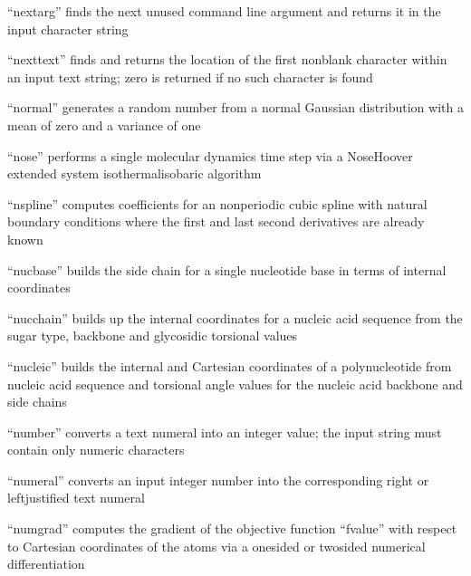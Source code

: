 \documentclass[letterpaper,11pt,english]{sphinxmanual}
\begin{document}
“nextarg” finds the next unused command line argument
and returns it in the input character string


“nexttext” finds and returns the location of the first
non\sphinxhyphen{}blank character within an input text string; zero
is returned if no such character is found


“normal” generates a random number from a normal Gaussian
distribution with a mean of zero and a variance of one


“nose” performs a single molecular dynamics time step via
a Nose\sphinxhyphen{}Hoover extended system isothermal\sphinxhyphen{}isobaric algorithm


“nspline” computes coefficients for an nonperiodic cubic spline
with natural boundary conditions where the first and last second
derivatives are already known


“nucbase” builds the side chain for a single nucleotide base
in terms of internal coordinates


“nucchain” builds up the internal coordinates for a nucleic
acid sequence from the sugar type, backbone and glycosidic
torsional values


“nucleic” builds the internal and Cartesian coordinates
of a polynucleotide from nucleic acid sequence and torsional
angle values for the nucleic acid backbone and side chains


“number” converts a text numeral into an integer value;
the input string must contain only numeric characters


“numeral” converts an input integer number into the
corresponding right\sphinxhyphen{} or left\sphinxhyphen{}justified text numeral


“numgrad” computes the gradient of the objective function
“fvalue” with respect to Cartesian coordinates of the atoms
via a one\sphinxhyphen{}sided or two\sphinxhyphen{}sided numerical differentiation
\end{document}
